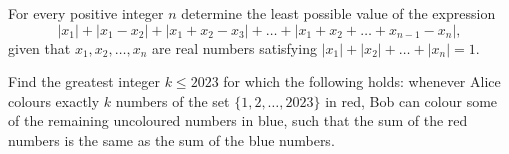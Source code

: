 \documentclass[11pt]{article}
\theoremstyle{definition}
\begin{document}
\begin{question}[name={2023 Bulgaria National Olympiad, \href{https://artofproblemsolving.com/community/c6h3049023p27467977}{Problem 5}}]
	For every positive integer $n$ determine the least possible value of the expression
	\[|x_{1}|+|x_{1}-x_{2}|+|x_{1}+x_{2}-x_{3}|+\dots +|x_{1}+x_{2}+\dots +x_{n-1}-x_{n}|,\]given that $x_{1}, x_{2}, \dots , x_{n}$ are real numbers satisfying $|x_{1}|+|x_{2}|+\dots+|x_{n}| = 1$.
\end{question}

%	



\begin{question}[name={2023 British Mathematical Olympiad, Problem 4}]
	Find the greatest integer $k\leq 2023$ for which the following holds: whenever Alice colours exactly $k$ numbers of the set $\{1,2,\dots, 2023\}$ in red, Bob can colour some of the remaining uncoloured numbers in blue, such that the sum of the red numbers is the same as the sum of the blue numbers.
\end{question}
\end{document}

